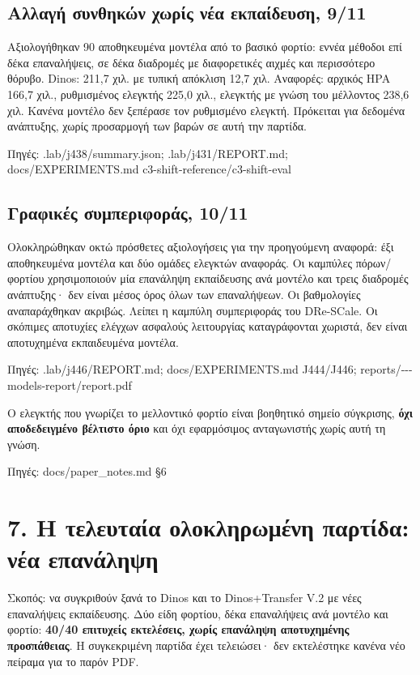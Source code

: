 \documentclass[10pt,a4paper]{article}
\newcommand{\src}[1]{\par{\scriptsize\color{gray}Πηγές: {\ttfamily #1}}\par}
\newcommand{\page}[1]{\clearpage\section*{#1}}
\begin{document}
\subsection*{Αλλαγή συνθηκών χωρίς νέα εκπαίδευση, 9/11}
Αξιολογήθηκαν 90 αποθηκευμένα μοντέλα από το βασικό φορτίο: εννέα μέθοδοι επί δέκα επαναλήψεις, σε δέκα διαδρομές με διαφορετικές αιχμές και περισσότερο θόρυβο. Dinos: 211,7 χιλ. με τυπική απόκλιση 12,7 χιλ. Αναφορές: αρχικός HPA 166,7 χιλ., ρυθμισμένος ελεγκτής 225,0 χιλ., ελεγκτής με γνώση του μέλλοντος 238,6 χιλ. Κανένα μοντέλο δεν ξεπέρασε τον ρυθμισμένο ελεγκτή. Πρόκειται για δεδομένα ανάπτυξης, χωρίς προσαρμογή των βαρών σε αυτή την παρτίδα.
\src{.lab/\allowbreak j438/\allowbreak summary.json; .lab/\allowbreak j431/\allowbreak REPORT.md; docs/\allowbreak EXPERIMENTS.md c3-\allowbreak shift-\allowbreak reference/\allowbreak c3-\allowbreak shift-\allowbreak eval}
\subsection*{Γραφικές συμπεριφοράς, 10/11}
Ολοκληρώθηκαν οκτώ πρόσθετες αξιολογήσεις για την προηγούμενη αναφορά: έξι αποθηκευμένα μοντέλα και δύο ομάδες ελεγκτών αναφοράς. Οι καμπύλες πόρων/φορτίου χρησιμοποιούν μία επανάληψη εκπαίδευσης ανά μοντέλο και τρεις διαδρομές ανάπτυξης· δεν είναι μέσος όρος όλων των επαναλήψεων. Οι βαθμολογίες αναπαράχθηκαν ακριβώς. Λείπει η καμπύλη συμπεριφοράς του DRe-SCale. Οι σκόπιμες αποτυχίες ελέγχων ασφαλούς λειτουργίας καταγράφονται χωριστά, δεν είναι αποτυχημένα εκπαιδευμένα μοντέλα.
\src{.lab/\allowbreak j446/\allowbreak REPORT.md; docs/\allowbreak EXPERIMENTS.md J444/\allowbreak J446; reports/\allowbreak 2026-\allowbreak 11-\allowbreak 10-\allowbreak models-\allowbreak report/\allowbreak report.pdf}
Ο ελεγκτής που γνωρίζει το μελλοντικό φορτίο είναι βοηθητικό σημείο σύγκρισης, \textbf{όχι αποδεδειγμένο βέλτιστο όριο} και όχι εφαρμόσιμος ανταγωνιστής χωρίς αυτή τη γνώση.
\src{docs/\allowbreak paper\_notes.md §6}
\page{7. Η τελευταία ολοκληρωμένη παρτίδα: νέα επανάληψη}
Σκοπός: να συγκριθούν ξανά το Dinos και το Dinos+Transfer V.2 με νέες επαναλήψεις εκπαίδευσης. Δύο είδη φορτίου, δέκα επαναλήψεις ανά μοντέλο και φορτίο: \textbf{40/40 επιτυχείς εκτελέσεις, χωρίς επανάληψη αποτυχημένης προσπάθειας}. Η συγκεκριμένη παρτίδα έχει τελειώσει· δεν εκτελέστηκε κανένα νέο πείραμα για το παρόν PDF.
\end{document}
